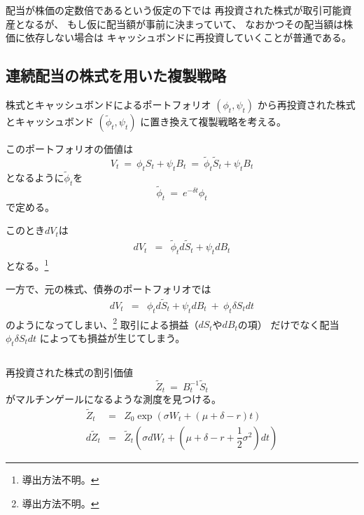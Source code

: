 \documentclass[uplatex,a4j,12pt,dvipdfmx]{jsarticle}
\begin{document}
${}$

配当が株価の定数倍であるという仮定の下では
再投資された株式が取引可能資産となるが、
もし仮に配当額が事前に決まっていて、
なおかつその配当額は株価に依存しない場合は
キャッシュボンドに再投資していくことが普通である。

\subsection{連続配当の株式を用いた複製戦略}

株式とキャッシュボンドによるポートフォリオ
$(\phi_{t},\psi_{t})$
から再投資された株式とキャッシュボンド
$(\tilde{\phi}_{t},\psi_{t})$
に置き換えて複製戦略を考える。

このポートフォリオの価値は
$$
	V_{t}
	\ = \
	\phi_{t} S_{t} + \psi_{t} B_{t}
	\ = \
	\tilde{\phi}_{t} \tilde{S}_{t} + \psi_{t} B_{t}
$$
となるように$\tilde{\phi}_{t}$を
$$
	\tilde{\phi}_{t} \ = \
	e^{- \delta t} \phi_{t}
$$
で定める。

このとき$dV_{t}$は
%
\begin{eqnarray*}
	dV_{t}
	&=&
	\tilde{\phi}_{t} d \tilde{S}_{t} + \psi_{t} d B_{t}
\end{eqnarray*}
%
となる。\footnote{導出方法不明。}

一方で、元の株式、債券のポートフォリオでは
%
\begin{eqnarray*}
	dV_{t}
	&=&
	\phi_{t} d \tilde{S}_{t} + \psi_{t} d B_{t}
	\ + \
	\phi_{t} \delta S_{t} dt
\end{eqnarray*}
%
のようになってしまい、\footnote{導出方法不明。}
取引による損益（$dS_{t}$や$dB_{t}$の項）
だけでなく配当$\phi_{t} \delta S_{t} dt$
によっても損益が生じてしまう。

${}$

再投資された株式の割引価値
$$
	\tilde{Z}_{t}
	\ = \
	B^{-1}_{t}
	\tilde{S}_{t}
$$
がマルチンゲールになるような測度を見つける。
%
%
\begin{eqnarray*}
	\tilde{Z}_{t}
	&=&
	Z_{0} \exp (\sigma W_{t} + ( \mu + \delta -r ) t )
	\\
	d \tilde{Z}_{t}
	&=&
	\tilde{Z}_{t}
	\left( \sigma dW_{t} + \left( \mu + \delta -r + \dfrac{1}{2} \sigma^{2} \right) dt \right)
\end{eqnarray*}
%
%
\end{document}
